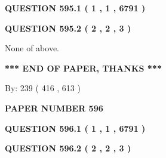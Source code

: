 \documentclass[12pt]{article}
\begin{document}
   
  
\vspace{0.2in}
  
{\textbf{\Large{QUESTION
595.1 
 ( 1 , 1 , 6791 )
}}}
  
  
  
\vspace{0.2in}
  
{\textbf{\Large{QUESTION
595.2 
 ( 2 , 2 , 3 )
}}}
  
  
 
 
\noindent{}
 
 
 None of above.
 
 
 
 
   
   
 \vspace{0.2in}
 
   
   
   
   
\vspace{1.0in} 
{\textbf{\large{ *** END OF PAPER, THANKS *** }}} 
   
   
\hspace{1.0in} By: 
 239 ( 416 ,  613 )
   
   
   
   
\newpage 
\setcounter{page}{ 
   596001 } 
   
   
   
   
 {\textbf{ \Large{ PAPER NUMBER  596  }}}
   
   
\vspace{0.2in}
   
   
   
   
   
   
 \vspace{0.2in}
 
 
 
 
   
   
  
\vspace{0.2in}
  
{\textbf{\Large{QUESTION
596.1 
 ( 1 , 1 , 6791 )
}}}
  
  
  
\vspace{0.2in}
  
{\textbf{\Large{QUESTION
596.2 
 ( 2 , 2 , 3 )
}}}
  
\end{document}
